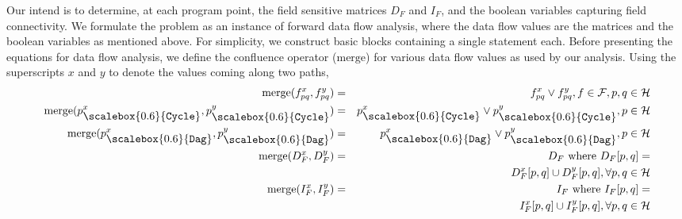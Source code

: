 \documentclass{sig-alternate}
\newcommand{\p}{\ensuremath{p}}
\newcommand{\q}{\ensuremath{q}}
\newcommand{\heap}{\ensuremath{\mathcal{H}}}
\newcommand{\fields}{\ensuremath{\mathcal{F}}}
\newcommand{\nat}{\ensuremath{\mathcal{N}}}
\newcommand{\subC}{\mbox{\scalebox{0.6}{\Cycle}}}
\newcommand{\subD}{\mbox{\scalebox{0.6}{\Dag}}}
\newcommand{\merge}{\ensuremath{\mathrm{merge}}}
\newcommand{\Dag}{{\tt Dag}}
\newcommand{\Cycle}{{\tt Cycle}}
\newcommand{\sub}[2]{\ensuremath{{#1}_{#2}}}
\begin{document}
Our intend is to determine, at each program point, the field
sensitive matrices $\sub{D}{F}$ and $\sub{I}{F}$, and the
boolean variables capturing field connectivity. We formulate
the problem as an instance of forward data flow analysis,
where the data flow values are the matrices and the boolean
variables as mentioned above.  For simplicity, we construct
basic blocks containing a single statement each. Before
presenting the equations for data flow analysis, we define
the confluence operator (\merge) for various data flow values
as used by our analysis. Using the superscripts $x$ and $y$
to denote the values coming along two paths,
\begin{eqnarray*}
  \merge( f_{\p\q}^x, f_{\p\q}^y ) &=& f_{\p\q}^x \vee f_{\p\q}^y , f \in \fields,
  \p,\q \in \heap \\
   \merge(\p_{\subC}^x, \p_{\subC}^y) &=& \p_{\subC}^x \vee
   \p_{\subC}^y, \p \in \heap \\
   \merge(\p_{\subD}^x, \p_{\subD}^y) &=& \p_{\subD}^x \vee
   \p_{\subD}^y, \p \in \heap \\
   \merge(\sub{D}{F}^{x}, \sub{D}{F}^{y}) &=& D_F \mbox{ where }
   D_F[{\p}, {\q}]  = \\ 
   && \sub{D}{F}^{x}[{\p}, {\q}] \cup
   \sub{D}{F}^{y}[{\p}, {\q}],   \forall {\p}, {\q} \in \heap\\ 
   \merge(\sub{I}{F}^{x}, \sub{I}{F}^{y}) &=& I_F \mbox{ where }
   I_F[{\p}, {\q}]  = \\
   && \sub{I}{F}^{x}[{\p}, {\q}] \cup
   \sub{I}{F}^{y}[{\p}, {\q}],  \forall {\p}, {\q} \in \heap
\end{eqnarray*}
\end{document}

